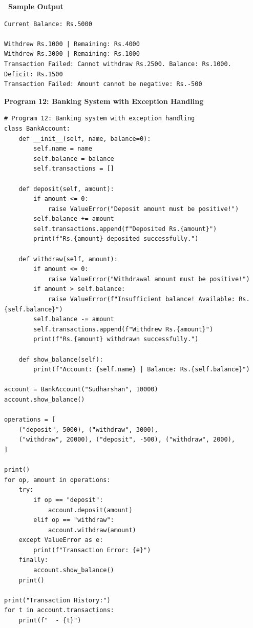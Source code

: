 \documentclass[12pt,a4paper]{article}
\newcommand{\outhead}{\noindent\colorbox{cmrgreen!25}%
  {\textbf{\small\color{cmrdark}~Sample Output~}}\par\vspace{-1pt}}
\begin{document}
\outhead
\begin{lstlisting}[style=outputstyle]
Current Balance: Rs.5000

Withdrew Rs.1000 | Remaining: Rs.4000
Withdrew Rs.3000 | Remaining: Rs.1000
Transaction Failed: Cannot withdraw Rs.2500. Balance: Rs.1000. Deficit: Rs.1500
Transaction Failed: Amount cannot be negative: Rs.-500
\end{lstlisting}

\vspace{0.5cm}

\textbf{Program 12: Banking System with Exception Handling}

\begin{lstlisting}
# Program 12: Banking system with exception handling
class BankAccount:
    def __init__(self, name, balance=0):
        self.name = name
        self.balance = balance
        self.transactions = []

    def deposit(self, amount):
        if amount <= 0:
            raise ValueError("Deposit amount must be positive!")
        self.balance += amount
        self.transactions.append(f"Deposited Rs.{amount}")
        print(f"Rs.{amount} deposited successfully.")

    def withdraw(self, amount):
        if amount <= 0:
            raise ValueError("Withdrawal amount must be positive!")
        if amount > self.balance:
            raise ValueError(f"Insufficient balance! Available: Rs.{self.balance}")
        self.balance -= amount
        self.transactions.append(f"Withdrew Rs.{amount}")
        print(f"Rs.{amount} withdrawn successfully.")

    def show_balance(self):
        print(f"Account: {self.name} | Balance: Rs.{self.balance}")

account = BankAccount("Sudharshan", 10000)
account.show_balance()

operations = [
    ("deposit", 5000), ("withdraw", 3000),
    ("withdraw", 20000), ("deposit", -500), ("withdraw", 2000),
]

print()
for op, amount in operations:
    try:
        if op == "deposit":
            account.deposit(amount)
        elif op == "withdraw":
            account.withdraw(amount)
    except ValueError as e:
        print(f"Transaction Error: {e}")
    finally:
        account.show_balance()
    print()

print("Transaction History:")
for t in account.transactions:
    print(f"  - {t}")
\end{lstlisting}
\end{document}
